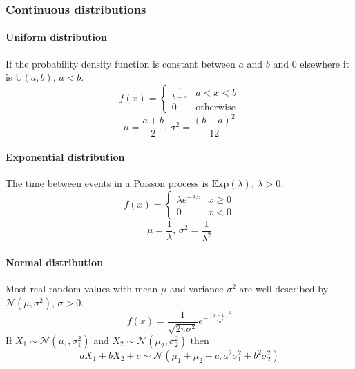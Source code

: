\subsubsection{Continuous distributions}

\paragraph{Uniform distribution}
If the probability density function is constant between $a$ and $b$ and 0 elsewhere it is $\textrm{U}(a,b),\,a<b$.
\[f(x) = \left\{
\begin{array}{cl}
\frac{1}{b-a} & a<x<b\\
0 & \textrm{otherwise}
\end{array}\right.\]
\[\mu=\frac{a+b}{2},\,\sigma^2=\frac{(b-a)^2}{12}\]

\paragraph{Exponential distribution}
The time between events in a Poisson process is $\textrm{Exp}(\lambda),\,\lambda>0$.
\[f(x) = \left\{
\begin{array}{cl}
\lambda e^{-\lambda x} & x\geq0\\
0 & x<0
\end{array}\right.\]
\[\mu=\frac{1}{\lambda},\,\sigma^2=\frac{1}{\lambda^2}\]

\paragraph{Normal distribution}
Most real random values with mean $\mu$ and variance $\sigma^2$ are well described by $\mathcal{N}(\mu,\sigma^2),\,\sigma>0$.
\[ f(x) = \frac{1}{\sqrt{2\pi\sigma^2}}e^{-\frac{(x-\mu)^2}{2\sigma^2}} \]
If $X_1 \sim \mathcal{N}(\mu_1,\sigma_1^2)$ and $X_2 \sim \mathcal{N}(\mu_2,\sigma_2^2)$ then
\[ aX_1 + bX_2 + c \sim \mathcal{N}(\mu_1+\mu_2+c,a^2\sigma_1^2+b^2\sigma_2^2) \]



